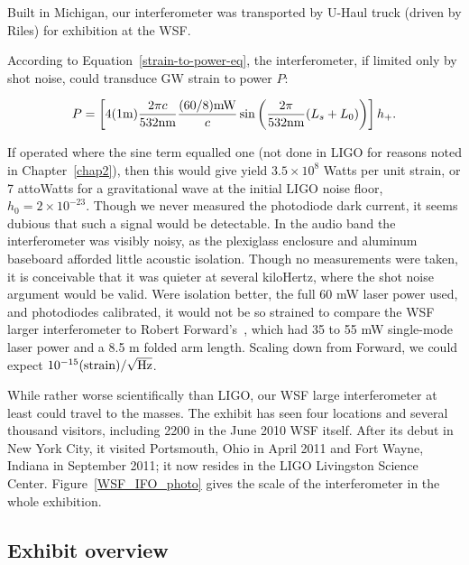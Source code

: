 Built in Michigan, our interferometer was transported by U-Haul truck (driven by Riles) for exhibition at the WSF.

According to Equation~\ref{strain-to-power-eq}, the interferometer, if limited only by shot noise, could transduce GW strain to power $P$:

\begin{equation}
P = \left[ 4 (1 \textup{m}) \frac{2\pi c}{532 \textup{nm}} \frac{(60/8) \textup{mW}}{c} \sin \left(\frac{2\pi}{532 \textup{nm}} (L_s+L_0) \right) \right] h_+.
\end{equation}

\noindent If operated where the sine term equalled one (not done in LIGO for reasons noted in Chapter~\ref{chap2}), then this would give yield $3.5\times 10^8$ Watts per unit strain, or 7 attoWatts for a gravitational wave at the initial LIGO noise floor, $h_0 = 2\times 10^{-23}$.
Though we never measured the photodiode dark current, it seems dubious that such a signal would be detectable.
In the audio band the interferometer was visibly noisy, as the plexiglass enclosure and aluminum baseboard afforded little acoustic isolation.
Though no measurements were taken, it is conceivable that it was quieter at several kiloHertz, where the shot noise argument would be valid.
Were isolation better, the full 60 mW laser power used, and photodiodes calibrated, it would not be so strained to compare the WSF larger interferometer to Robert Forward's~\cite{Forward1978}, which had 35 to 55 mW single-mode laser power and a 8.5 m folded arm length.
Scaling down from Forward, we could expect $10^{-15} \textup{(strain)}/\sqrt{\textup{Hz}}$.



While rather worse scientifically than LIGO, our WSF large interferometer at least could travel to the masses.
The exhibit has seen four locations and several thousand visitors, including 2200 in the June 2010 WSF itself.
After its debut in New York City, it visited Portsmouth, Ohio in April 2011 and Fort Wayne, Indiana in September 2011; it now resides in the LIGO Livingston Science Center.
Figure~\ref{WSF_IFO_photo} gives the scale of the interferometer in the whole exhibition.

        \subsection{Exhibit overview}
        \label{exhibit_overview}

